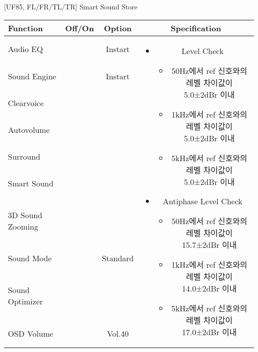\begin{frame}[t]{[UF85, FL/FR/TL/TR] Smart Sound Store}
\begin{tiny}
\begin{tabular}{@{}lccc@{}}
\toprule
Function & Off/On & Option & Specification \\
\midrule
Audio EQ & \color{black}{Off} & Instart &
\multirow{10}{60mm}{
\begin{itemize}
\item Level Check
	\begin{itemize}
	\item 50Hz에서 ref 신호와의 레벨 차이값이 5.0±2dBr 이내
	\item 1kHz에서 ref 신호와의 레벨 차이값이 5.0±2dBr 이내
	\item 5kHz에서 ref 신호와의 레벨 차이값이 5.0±2dBr 이내
	\end{itemize}
\item Antiphase Level Check
	\begin{itemize}
	\item 50Hz에서 ref 신호와의 레벨 차이값이 15.7±2dBr 이내
	\item 1kHz에서 ref 신호와의 레벨 차이값이 14.0±2dBr 이내
	\item 5kHz에서 ref 신호와의 레벨 차이값이 17.0±2dBr 이내
	\end{itemize}
\end{itemize}
} \\
Sound Engine & \color{blue}{On} & Instart & \\
Clearvoice & \color{black}{Off} & & \\
Autovolume & \color{black}{Off} & & \\
Surround & \color{black}{Off} & & \\
Smart Sound & \color{blue}{On} & & \\
3D Sound Zooming & \color{black}{Off} & & \\
Sound Mode & \color{blue}{On} & Standard & \\
Sound Optimizer & \color{black}{Off} & & \\
OSD Volume & \color{blue}{On} & Vol.40 & \\
\midrule
\end{tabular}
\end{tiny}

\end{frame}

